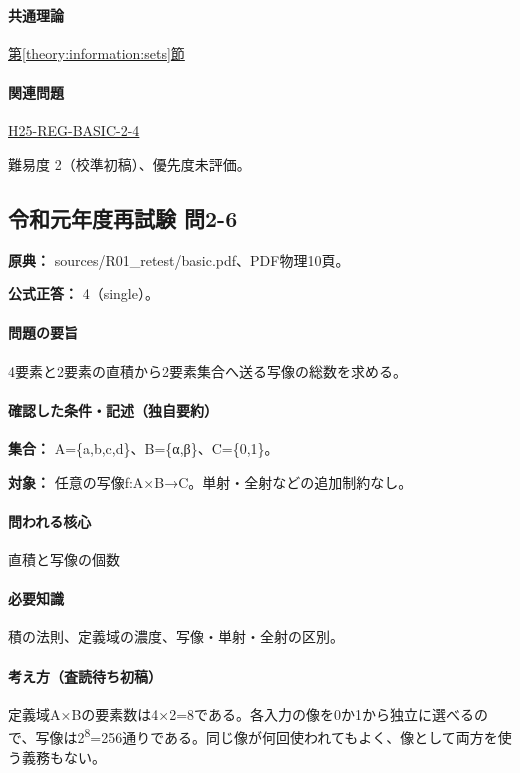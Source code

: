 \paragraph{共通理論} \hyperref[theory:information:sets]{第\ref*{theory:information:sets}節}

\paragraph{関連問題} \hyperref[q:h25-reg-basic-2-4]{H25-REG-BASIC-2-4}

\par 難易度 2（校準初稿）、優先度未評価。

\subsection{令和元年度再試験 問2-6}
\label{q:r01-ret-basic-2-6}

\noindent\textbf{原典：} sources/R01\_retest/basic.pdf、PDF物理10頁。

\textbf{公式正答：} 4（single）。

\paragraph{問題の要旨} 4要素と2要素の直積から2要素集合へ送る写像の総数を求める。

\paragraph{確認した条件・記述（独自要約）}\mbox{}\par

\noindent\textbf{集合：} A=\{a,b,c,d\}、B=\{α,β\}、C=\{0,1\}。\par

\noindent\textbf{対象：} 任意の写像f:A×B→C。単射・全射などの追加制約なし。\par

\paragraph{問われる核心} 直積と写像の個数

\paragraph{必要知識} 積の法則、定義域の濃度、写像・単射・全射の区別。

\paragraph{考え方（査読待ち初稿）} 定義域A×Bの要素数は4×2=\allowbreak{}8である。各入力の像を0か1から独立に選べるので、写像は2\textsuperscript{8}=256通りである。同じ像が何回使われてもよく、像として両方を使う義務もない。

